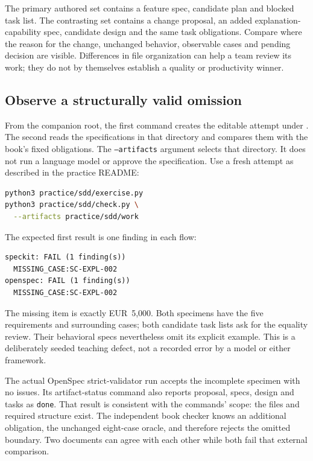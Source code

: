 The primary authored set contains a feature spec, candidate plan and blocked task list. The contrasting set contains a change proposal, an added explanation-capability spec, candidate design and the same task obligations. Compare where the reason for the change, unchanged behavior, observable cases and pending decision are visible. Differences in file organization can help a team review its work; they do not by themselves establish a quality or productivity winner.

\subsection{Observe a structurally valid omission}

From the companion root, the first command creates the editable attempt under . The second reads the specifications in that directory and compares them with the book's fixed obligations. The \texttt{--artifacts} argument selects that directory. It does not run a language model or approve the specification. Use a fresh attempt as described in the practice README:

\begin{lstlisting}[language=bash]
python3 practice/sdd/exercise.py
python3 practice/sdd/check.py \
  --artifacts practice/sdd/work
\end{lstlisting}

The expected first result is one finding in each flow:

\begin{lstlisting}
speckit: FAIL (1 finding(s))
  MISSING_CASE:SC-EXPL-002
openspec: FAIL (1 finding(s))
  MISSING_CASE:SC-EXPL-002
\end{lstlisting}

The missing item is exactly EUR~5,000. Both specimens have the five requirements and surrounding cases; both candidate task lists ask for the equality review. Their behavioral specs nevertheless omit its explicit example. This is a deliberately seeded teaching defect, not a recorded error by a model or either framework.

The actual OpenSpec strict-validator run accepts the incomplete specimen with no issues. Its artifact-status command also reports proposal, specs, design and tasks as \texttt{done}. That result is consistent with the commands' scope: the files and required structure exist. The independent book checker knows an additional obligation, the unchanged eight-case oracle, and therefore rejects the omitted boundary. Two documents can agree with each other while both fail that external comparison.

